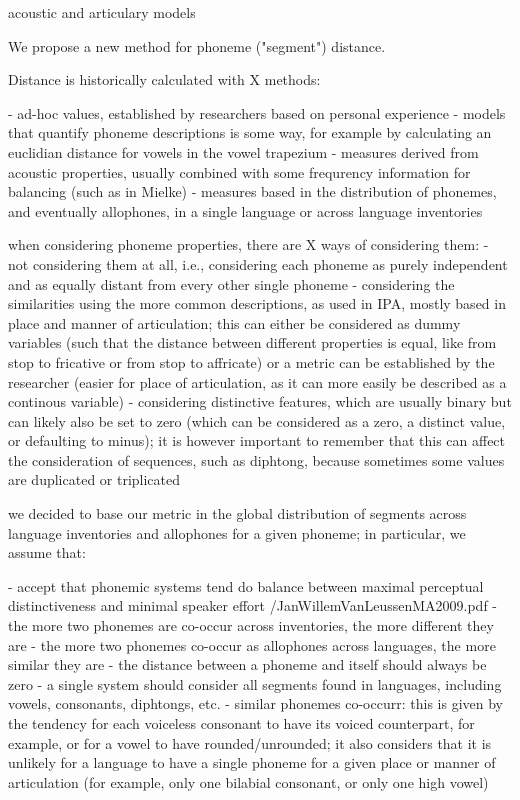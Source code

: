 acoustic and articulary models

We propose a new method for phoneme ("segment") distance.

Distance is historically calculated with X methods:

- ad-hoc values, established by researchers based on personal experience
- models that quantify phoneme descriptions is some way, for example by calculating an
euclidian distance for vowels in the vowel trapezium
- measures derived from acoustic properties, usually combined with some frequrency
information for balancing (such as in Mielke)
- measures based in the distribution of phonemes, and eventually allophones, in a single
language or across language inventories

when considering phoneme properties, there are X ways of considering them:
- not considering them at all, i.e., considering each phoneme as purely independent and
as equally distant from every other single phoneme
- considering the similarities using the more common descriptions, as used in IPA,
mostly based in place and manner of articulation; this can either be considered as dummy
variables (such that the distance between different properties is equal, like from stop to
fricative or from stop to affricate) or a metric can be established by the researcher
(easier for place of articulation, as it can more easily be described as a continous
variable)
- considering distinctive features, which are usually binary but can likely also be set
to zero (which can be considered as a zero, a distinct value, or defaulting to minus);
it is however important to remember that this can affect the consideration of sequences,
such as diphtong, because sometimes some values are duplicated or triplicated

we decided to base our metric in the global distribution of segments across language
inventories and allophones for a given phoneme; in particular, we assume that:

- accept that phonemic systems tend do balance between maximal perceptual distinctiveness
and minimal speaker effort /JanWillemVanLeussenMA2009.pdf
- the more two phonemes are co-occur across inventories, the more different they are
- the more two phonemes co-occur as allophones across languages, the more similar
they are
- the distance between a phoneme and itself should always be zero
- a single system should consider all segments found in languages, including vowels,
consonants, diphtongs, etc.
- similar phonemes co-occurr: this is given by the tendency for each voiceless consonant to
have its voiced counterpart, for example, or for a vowel to have rounded/unrounded; it
also considers that it is unlikely for a language to have a single phoneme for a given place
or manner of articulation (for example, only one bilabial consonant, or only one high vowel)
